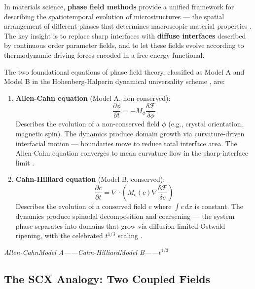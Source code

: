 \documentclass[12pt,a4paper]{article}
\theoremstyle{plain}
\theoremstyle{definition}
\newcommand{\cF}{\mathcal{F}}
\newcommand{\cn}[1]{\textcolor{scxgray}{\textit{#1}}}
\begin{document}
In materials science, \textbf{phase field methods} provide a unified framework
for describing the spatiotemporal evolution of microstructures — the spatial
arrangement of different phases that determines macroscopic material properties
\cite{chen2002, provatas2011}. The key insight is to replace sharp interfaces
with \textbf{diffuse interfaces} described by continuous order parameter fields,
and to let these fields evolve according to thermodynamic driving forces encoded
in a free energy functional.

The two foundational equations of phase field theory, classified as Model A and
Model B in the Hohenberg-Halperin dynamical universality scheme \cite{hohenberg1977}, are:

\begin{enumerate}[label=(\arabic*)]
    \item \textbf{Allen-Cahn equation} (Model A, non-conserved):
    \begin{equation}
        \frac{\partial \phi}{\partial t} = -M_\phi \frac{\delta \cF}{\delta \phi}
        \label{eq:ac_classic}
    \end{equation}
    Describes the evolution of a non-conserved field $\phi$ (e.g., crystal
    orientation, magnetic spin). The dynamics produce domain growth via
    curvature-driven interfacial motion — boundaries move to reduce total
    interface area. The Allen-Cahn equation converges to mean curvature flow
    in the sharp-interface limit \cite{evans1992, ilmanen1993}.

    \item \textbf{Cahn-Hilliard equation} (Model B, conserved):
    \begin{equation}
        \frac{\partial c}{\partial t} = \nabla \cdot \left(M_c(c) \nabla
        \frac{\delta \cF}{\delta c}\right)
        \label{eq:ch_classic}
    \end{equation}
    Describes the evolution of a conserved field $c$ where $\int c\,dx$ is constant.
    The dynamics produce spinodal decomposition and coarsening — the system
    phase-separates into domains that grow via diffusion-limited Ostwald ripening,
    with the celebrated $t^{1/3}$ scaling \cite{lifshitz1961, wagner1961}.
\end{enumerate}

\bigskip
\noindent
\cn{Allen-CahnModel A——Cahn-HilliardModel B——$t^{1/3}$}

\subsection{The SCX Analogy: Two Coupled Fields}
\end{document}
